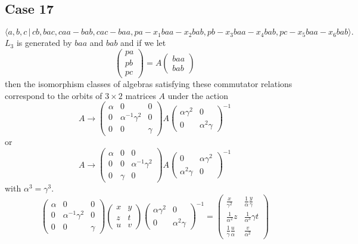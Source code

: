 \documentclass[10pt,thmsa]{article}
\begin{document}
\subsection{Case 17}

\[
\langle
a,b,c\,|%
\,cb,bac,caa-bab,cac-baa,pa-x_{1}baa-x_{2}bab,pb-x_{3}baa-x_{4}bab,pc-x_{5}baa-x_{6}bab\rangle . 
\]%
$L_{3}$ is generated by $baa$ and $bab$ and if we let 
\[
\left( 
\begin{array}{l}
pa \\ 
pb \\ 
pc%
\end{array}%
\right) =A\left( 
\begin{array}{l}
baa \\ 
bab%
\end{array}%
\right) 
\]%
then the isomorphism classes of algebras satisfying these commutator
relations correspond to the orbits of $3\times 2$ matrices $A$ under the
action 
\[
A\rightarrow \left( 
\begin{array}{lll}
\alpha & 0 & 0 \\ 
0 & \alpha ^{-1}\gamma ^{2} & 0 \\ 
0 & 0 & \gamma%
\end{array}%
\right) A\left( 
\begin{array}{ll}
\alpha \gamma ^{2} & 0 \\ 
0 & \alpha ^{2}\gamma%
\end{array}%
\right) ^{-1} 
\]%
or 
\[
A\rightarrow \left( 
\begin{array}{lll}
\alpha & 0 & 0 \\ 
0 & 0 & \alpha ^{-1}\gamma ^{2} \\ 
0 & \gamma & 0%
\end{array}%
\right) A\left( 
\begin{array}{ll}
0 & \alpha \gamma ^{2} \\ 
\alpha ^{2}\gamma & 0%
\end{array}%
\right) ^{-1} 
\]%
with $\alpha ^{3}=\gamma ^{3}$. 
\[
\left( 
\begin{array}{lll}
\alpha & 0 & 0 \\ 
0 & \alpha ^{-1}\gamma ^{2} & 0 \\ 
0 & 0 & \gamma%
\end{array}%
\right) \left( 
\begin{array}{ll}
x & y \\ 
z & t \\ 
u & v%
\end{array}%
\right) \left( 
\begin{array}{ll}
\alpha \gamma ^{2} & 0 \\ 
0 & \alpha ^{2}\gamma%
\end{array}%
\right) ^{-1}=\allowbreak \left( 
\begin{array}{cc}
\frac{x}{\gamma ^{2}} & \frac{1}{\alpha }\frac{y}{\gamma } \\ 
\frac{1}{\alpha ^{2}}z & \frac{1}{\alpha ^{3}}\gamma t \\ 
\frac{1}{\gamma }\frac{u}{\alpha } & \frac{v}{\alpha ^{2}}%
\end{array}%
\right) 
\]%
\end{document}
